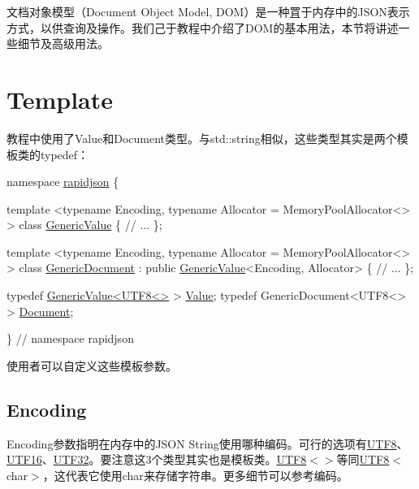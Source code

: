 文档对象模型（\+Document Object Model, D\+O\+M）是一种罝于内存中的\+J\+S\+O\+N表示方式，以供查询及操作。我们己于教程中介绍了\+D\+O\+M的基本用法，本节将讲述一些细节及高级用法。\hypertarget{md_Cadriciel_Commun_Externe_RapidJSON_doc_dom.zh-cn_Template}{}\section{Template}\label{md_Cadriciel_Commun_Externe_RapidJSON_doc_dom.zh-cn_Template}
教程中使用了{\ttfamily Value}和{\ttfamily Document}类型。与{\ttfamily std\+::string}相似，这些类型其实是两个模板类的{\ttfamily typedef}：


\begin{DoxyCode}
\textcolor{keyword}{namespace }\hyperlink{namespacerapidjson}{rapidjson} \{

\textcolor{keyword}{template} <\textcolor{keyword}{typename} Encoding, \textcolor{keyword}{typename} Allocator = MemoryPoolAllocator<> >
\textcolor{keyword}{class }\hyperlink{class_generic_value}{GenericValue} \{
    \textcolor{comment}{// ...}
\};

\textcolor{keyword}{template} <\textcolor{keyword}{typename} Encoding, \textcolor{keyword}{typename} Allocator = MemoryPoolAllocator<> >
\textcolor{keyword}{class }\hyperlink{class_generic_document}{GenericDocument} : \textcolor{keyword}{public} \hyperlink{class_generic_value}{GenericValue}<Encoding, Allocator> \{
    \textcolor{comment}{// ...}
\};

\textcolor{keyword}{typedef} \hyperlink{class_generic_value}{GenericValue<UTF8<>} > \hyperlink{document_8h_a071cf97155ba72ac9a1fc4ad7e63d481}{Value};
\textcolor{keyword}{typedef} GenericDocument<UTF8<> > \hyperlink{document_8h_ac6ea5b168e3fe8c7fa532450fc9391f7}{Document};

\} \textcolor{comment}{// namespace rapidjson}
\end{DoxyCode}


使用者可以自定义这些模板参数。\hypertarget{md_Cadriciel_Commun_Externe_RapidJSON_doc_dom.zh-cn_Encoding}{}\subsection{Encoding}\label{md_Cadriciel_Commun_Externe_RapidJSON_doc_dom.zh-cn_Encoding}
{\ttfamily Encoding}参数指明在内存中的\+J\+S\+ON String使用哪种编码。可行的选项有{\ttfamily \hyperlink{struct_u_t_f8}{U\+T\+F8}}、{\ttfamily \hyperlink{struct_u_t_f16}{U\+T\+F16}}、{\ttfamily \hyperlink{struct_u_t_f32}{U\+T\+F32}}。要注意这3个类型其实也是模板类。{\ttfamily \hyperlink{struct_u_t_f8}{U\+T\+F8}$<$$>$}等同{\ttfamily \hyperlink{struct_u_t_f8}{U\+T\+F8}$<$char$>$}，这代表它使用{\ttfamily char}来存储字符串。更多细节可以参考编码。

